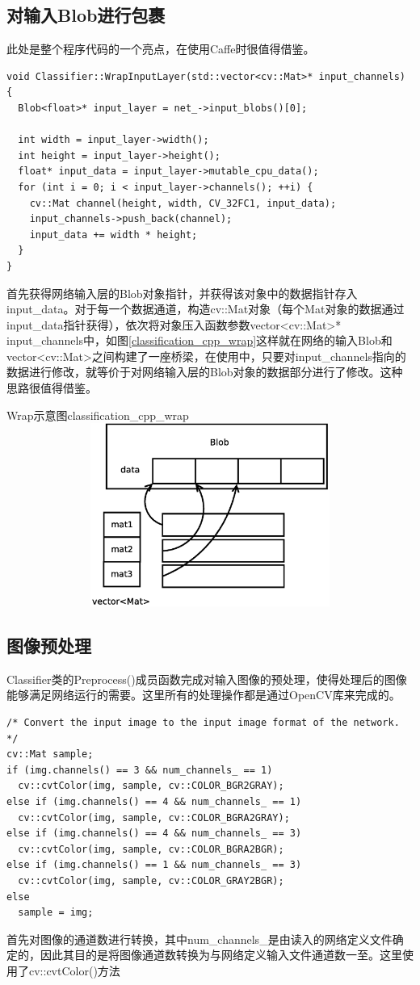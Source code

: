 \subsection{对输入Blob进行包裹}
此处是整个程序代码的一个亮点，在使用Caffe时很值得借鉴。
\begin{verbatim}
void Classifier::WrapInputLayer(std::vector<cv::Mat>* input_channels) {
  Blob<float>* input_layer = net_->input_blobs()[0];

  int width = input_layer->width();
  int height = input_layer->height();
  float* input_data = input_layer->mutable_cpu_data();
  for (int i = 0; i < input_layer->channels(); ++i) {
    cv::Mat channel(height, width, CV_32FC1, input_data);
    input_channels->push_back(channel);
    input_data += width * height;
  }
}
\end{verbatim}
首先获得网络输入层的Blob对象指针，并获得该对象中的数据指针存入input\_data。对于每一个数据通道，构造cv::Mat对象（每个Mat对象的数据通过input\_data指针获得），依次将对象压入函数参数vector<cv::Mat>* input\_channels中，如图\ref{classification_cpp_wrap}这样就在网络的输入Blob和vector<cv::Mat>之间构建了一座桥梁，在使用中，只要对input\_channels指向的数据进行修改，就等价于对网络输入层的Blob对象的数据部分进行了修改。这种思路很值得借鉴。
\begin{cnfigure}{Wrap示意图}{classification_cpp_wrap}
\includegraphics[height=6cm ,width=14cm,angle=0]{include/chp_from_examples/figures/classification_cpp_wrap.eps}
\end{cnfigure}


\subsection{图像预处理}
Classifier类的Preprocess()成员函数完成对输入图像的预处理，使得处理后的图像能够满足网络运行的需要。这里所有的处理操作都是通过OpenCV库来完成的。
\begin{verbatim}
/* Convert the input image to the input image format of the network. */
cv::Mat sample;
if (img.channels() == 3 && num_channels_ == 1)
  cv::cvtColor(img, sample, cv::COLOR_BGR2GRAY);
else if (img.channels() == 4 && num_channels_ == 1)
  cv::cvtColor(img, sample, cv::COLOR_BGRA2GRAY);
else if (img.channels() == 4 && num_channels_ == 3)
  cv::cvtColor(img, sample, cv::COLOR_BGRA2BGR);
else if (img.channels() == 1 && num_channels_ == 3)
  cv::cvtColor(img, sample, cv::COLOR_GRAY2BGR);
else
  sample = img;
\end{verbatim}
首先对图像的通道数进行转换，其中num\_channels\_是由读入的网络定义文件确定的，因此其目的是将图像通道数转换为与网络定义输入文件通道数一至。这里使用了cv::cvtColor()方法

